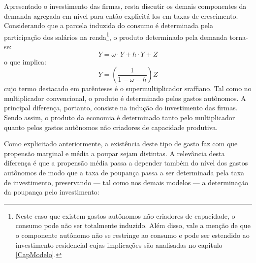 Apresentado o investimento das firmas, resta discutir os demais componentes da demanda agregada em nível para então explicitá-los em taxas de crescimento.
Considerando que a parcela induzida do consumo é determinada pela participação dos salários  na renda\footnote{Neste caso que existem gastos autônomos não criadores de capacidade, o consumo pode não ser totalmente induzido. Além disso, vale a menção de que o componente autônomo não se restringe ao consumo e pode ser estendido ao investimento residencial cujas implicações são analisadas no capitulo \ref{CapModelo}.}, o produto determinado pela demanda torna-se:
\begin{equation}
\label{PIBSuper}
Y = \omega\cdot Y + h\cdot Y + Z
\end{equation}
o que implica:
\begin{equation}
\label{Supermultiplicador}
Y = \left(\frac{1}{1 - \omega - h}\right)Z
\end{equation}
cujo termo destacado em parênteses é o supermultiplicador sraffiano. Tal como no multiplicador convencional, o produto é determinado pelos gastos autônomos.
A principal diferença, portanto, consiste
na indução do investimento das firmas. 
Sendo assim, o produto da economia é determinado tanto pelo multiplicador quanto pelos gastos autônomos não criadores de capacidade produtiva.


Como explicitado anteriormente, a existência deste tipo de gasto faz com que propensão marginal e média a poupar sejam distintas. A relevância desta diferença é que a propensão média passa a depender também do nível dos gastos autônomos
de modo que a taxa de poupança passa a ser determinada pela taxa de investimento, preservando --- tal como nos demais modelos --- a determinação da poupança pelo investimento:


